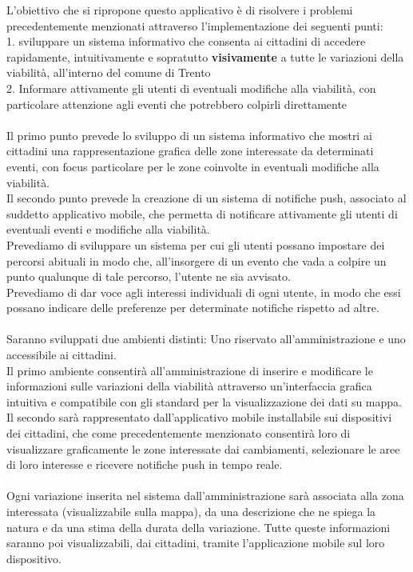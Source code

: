 \documentclass{article}
\begin{document}
L'obiettivo che si ripropone questo applicativo è di risolvere i problemi precedentemente menzionati attraverso l'implementazione dei seguenti punti:\\
1. sviluppare un sistema informativo che consenta ai cittadini di accedere rapidamente, intuitivamente e sopratutto \textbf{visivamente} a tutte le variazioni della viabilità, all'interno del comune di Trento\\
2. Informare attivamente gli utenti di eventuali modifiche alla viabilità, con particolare attenzione agli eventi che potrebbero colpirli direttamente\\ %
\\
Il primo punto prevede lo sviluppo di un sistema informativo che mostri ai cittadini una rappresentazione grafica delle zone interessate da determinati eventi, con focus particolare per le zone coinvolte in eventuali modifiche alla viabilità. \\
Il secondo punto prevede la creazione di un sistema di notifiche push, associato al suddetto applicativo mobile, che permetta di notificare attivamente gli utenti di eventuali eventi e modifiche alla viabilità.\\
Prevediamo di sviluppare un sistema per cui gli utenti possano impostare dei percorsi abituali in modo che, all'insorgere di un evento che vada a colpire un punto qualunque di tale percorso, l'utente ne sia avvisato. \\
Prevediamo di dar voce agli interessi individuali di ogni utente, in modo che essi possano indicare delle preferenze per determinate notifiche rispetto ad altre. %
 \\
 \\
Saranno sviluppati due ambienti distinti: Uno riservato all'amministrazione e uno accessibile ai cittadini.\\
Il primo ambiente consentirà all'amministrazione di inserire e modificare le informazioni sulle variazioni della viabilità attraverso un'interfaccia grafica intuitiva e compatibile con gli standard per la visualizzazione dei dati su mappa.\\
Il secondo sarà rappresentato dall'applicativo mobile installabile sui dispositivi dei cittadini, che come precedentemente menzionato consentirà loro di visualizzare graficamente le zone interessate dai cambiamenti, selezionare le aree di loro interesse e ricevere notifiche push in tempo reale.\\
\\
Ogni variazione inserita nel sistema dall'amministrazione sarà associata alla zona interessata (visualizzabile sulla mappa), da una descrizione che ne spiega la natura e da una stima della durata della variazione. Tutte queste informazioni saranno poi visualizzabili, dai cittadini, tramite l'applicazione mobile sul loro dispositivo. 
\clearpage
\end{document}
